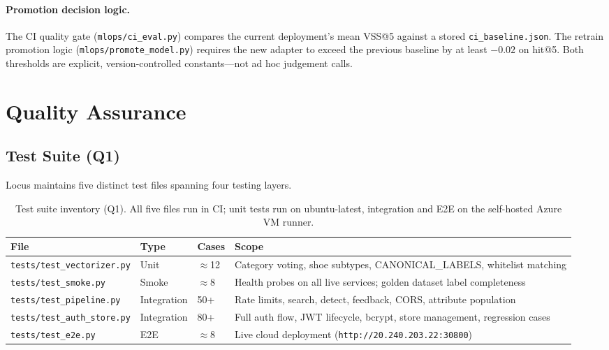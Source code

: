 \documentclass[12pt]{article}
\begin{document}
\paragraph{Promotion decision logic.}
The CI quality gate (\texttt{mlops/ci\_eval.py}) compares the current deployment's mean VSS@5 against a stored \texttt{ci\_baseline.json}. The retrain promotion logic (\texttt{mlops/promote\_model.py}) requires the new adapter to exceed the previous baseline by at least $-0.02$ on hit@5. Both thresholds are explicit, version-controlled constants---not ad hoc judgement calls.

\section{Quality Assurance}
\label{sec:qa}

\subsection{Test Suite (Q1)}

Locus maintains five distinct test files spanning four testing layers.

\begin{table}[H]
\centering
\small
\begin{tabular}{@{}llll@{}}
\toprule
\textbf{File} & \textbf{Type} & \textbf{Cases} & \textbf{Scope} \\ \midrule
\texttt{tests/test\_vectorizer.py}  & Unit          & $\approx$12 & Category voting, shoe subtypes, CANONICAL\_LABELS, whitelist matching \\
\texttt{tests/test\_smoke.py}       & Smoke         & $\approx$8  & Health probes on all live services; golden dataset label completeness \\
\texttt{tests/test\_pipeline.py}    & Integration   & 50+         & Rate limits, search, detect, feedback, CORS, attribute population \\
\texttt{tests/test\_auth\_store.py} & Integration   & 80+         & Full auth flow, JWT lifecycle, bcrypt, store management, regression cases \\
\texttt{tests/test\_e2e.py}         & E2E           & $\approx$8  & Live cloud deployment (\texttt{http://20.240.203.22:30800}) \\ \bottomrule
\end{tabular}
\caption{Test suite inventory (Q1). All five files run in CI; unit tests run on ubuntu-latest, integration and E2E on the self-hosted Azure VM runner.}
\label{tab:tests}
\end{table}
\end{document}
